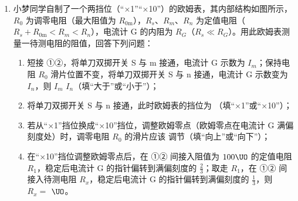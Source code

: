 \documentclass[\gkver]{gaokaozhenti}
\begin{document}
\begin{enumerate}
\item
小梦同学自制了一个两挡位（“$\times$1”“$\times$10”）的欧姆表，其内部结构如图所示，$R_{0}$ 为调零电阻（最大阻值为 $R_{0\mathrm{m}}$），$R_{s}$、$R_{m}$、$R_{n}$ 为定值电阻（$R_{s} + R_{0\mathrm{m}} < R_{m} < R_{n}$），电流计 G 的内阻为 $R_{G}$（$R_{s} \ll R_{G}$）。用此欧姆表测量一待测电阻的阻值，回答下列问题：
\begin{enumerate}
	\item
	短接 ①②，将单刀双掷开关 S 与 m 接通，电流计 G 示数为 $I_{m}$；保持电阻 $R_{0}$ 滑片位置不变，将单刀双掷开关 S 与 n 接通，电流计 G 示数变为 $I_{n}$，则 $I_{m}$  $I_{n}$（填“大于”或“小于”）；
	\item
	将单刀双掷开关 S 与 n 接通，此时欧姆表的挡位为 （填“$\times$1”或“$\times$10”）；
	\item
	若从“$\times$1”挡位换成“$\times$10”挡位，调整欧姆零点（欧姆零点在电流计 G 满偏刻度处）时，调零电阻 $R_{0}$ 的滑片应该  调节（填“向上”或“向下”）；
	\item
	在“$\times$10”挡位调整欧姆零点后，在 ①② 间接入阻值为 $100\UO$ 的定值电阻 $R_{1}$，稳定后电流计 G 的指针偏转到满偏刻度的 $\frac{2}{3}$；取走 $R_{1}$，在 ①② 间接入待测电阻 $R_{x}$，稳定后电流计 G 的指针偏转到满偏刻度的 $\frac{1}{3}$，则 $R_{x} =$  $\UO$。
\end{enumerate}


\end{enumerate}
\end{document}
